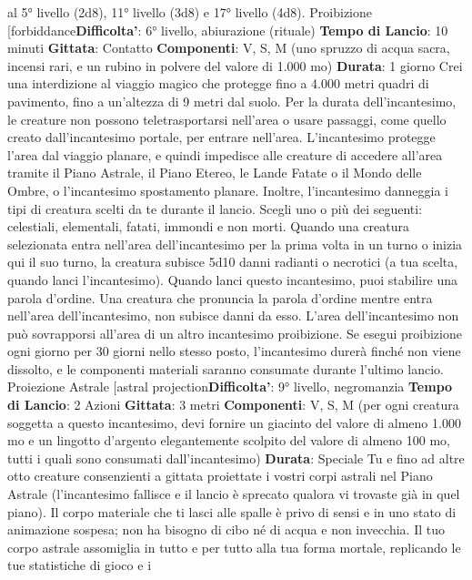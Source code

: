 \begin{multicols}{2}
al 5° livello (2d8), 11° livello (3d8) e 17° livello (4d8).
Proibizione
[forbiddance\textbf{Difficolta'}:
6° livello, abiurazione (rituale)
\textbf{Tempo di Lancio}: 10 minuti
\textbf{Gittata}: Contatto
\textbf{Componenti}: V, S, M (uno spruzzo di acqua sacra,
incensi rari, e un rubino in polvere del valore di 1.000
mo)
\textbf{Durata}: 1 giorno
Crei una interdizione al viaggio magico che protegge
fino a 4.000 metri quadri di pavimento, fino a un’altezza
di 9 metri dal suolo. Per la durata dell’incantesimo, le
creature non possono teletrasportarsi nell’area o usare
passaggi, come quello creato dall’incantesimo portale,
per entrare nell’area. L’incantesimo protegge l’area dal
viaggio planare, e quindi impedisce alle creature di
accedere all’area tramite il Piano Astrale, il Piano
Etereo, le Lande Fatate o il Mondo delle Ombre, o
l’incantesimo spostamento planare.
Inoltre, l’incantesimo danneggia i tipi di creatura scelti
da te durante il lancio. Scegli uno o più dei seguenti:
celestiali, elementali, fatati, immondi e non morti.
Quando una creatura selezionata entra nell’area
dell’incantesimo per la prima volta in un turno o inizia
qui il suo turno, la creatura subisce 5d10 danni radianti
o necrotici (a tua scelta, quando lanci l’incantesimo).
Quando lanci questo incantesimo, puoi stabilire una
parola d’ordine. Una creatura che pronuncia la parola
d’ordine mentre entra nell’area dell’incantesimo, non
subisce danni da esso.
L’area dell’incantesimo non può sovrapporsi all’area di
un altro incantesimo proibizione. Se esegui proibizione
ogni giorno per 30 giorni nello stesso posto,
l’incantesimo durerà finché non viene dissolto, e le
componenti materiali saranno consumate durante
l’ultimo lancio.
Proiezione Astrale
[astral projection\textbf{Difficolta'}:
9° livello, negromanzia
\textbf{Tempo di Lancio}: 2 Azioni
\textbf{Gittata}: 3 metri
\textbf{Componenti}: V, S, M (per ogni creatura soggetta a
questo incantesimo, devi fornire un giacinto del valore
di almeno 1.000 mo e un lingotto d’argento
elegantemente scolpito del valore di almeno 100 mo,
tutti i quali sono consumati dall’incantesimo)
\textbf{Durata}: Speciale
Tu e fino ad altre otto creature consenzienti a gittata
proiettate i vostri corpi astrali nel Piano Astrale
(l’incantesimo fallisce e il lancio è sprecato qualora vi
trovaste già in quel piano). Il corpo materiale che ti lasci
alle spalle è privo di sensi e in uno stato di animazione
sospesa; non ha bisogno di cibo né di acqua e non
invecchia.
Il tuo corpo astrale assomiglia in tutto e per tutto alla tua
forma mortale, replicando le tue statistiche di gioco e i

\end{multicols}

